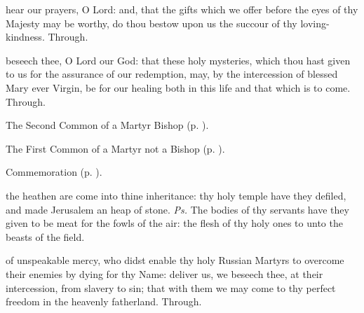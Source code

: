 
\secret
{} hear our prayers, O Lord: and, that the gifts which we offer before the eyes of thy Majesty may be worthy, do thou bestow upon us the succour of thy loving-kindness. Through.


\postcommunion
{} beseech thee, O Lord our God: that these holy mysteries, which thou hast given to us for the assurance of our redemption, may, by the intercession of blessed Mary ever Virgin, be for our healing both in this life and that which is to come. Through.



\begin{rubric}
	The Second Common of a Martyr Bishop (p. \pageref{CommonMartyrBishopII}).
\end{rubric}



\begin{rubric}
	The First Common of a Martyr not a Bishop (p. \pageref{CommonMartyrNotBishopI}).
\end{rubric}

\begin{rubric}
	Commemoration  (p. \pageref{NewMartyrsRussia}).
\end{rubric}


\clearpage
{}\label{NewMartyrsRussia}

\introit
{} the heathen are come into thine inheritance: thy holy temple have they defiled, and made Jerusalem an heap of stone. \textit{Ps.} The bodies of thy servants have they given to be meat for the fowls of the air: the flesh of thy holy ones to unto the beasts of the field.

\collect
{} of unspeakable mercy, who didst enable thy holy Russian Martyrs to overcome their enemies by dying for thy Name: deliver us, we beseech thee, at their intercession, from slavery to sin; that with them we may come to thy perfect freedom in the heavenly fatherland. Through.

